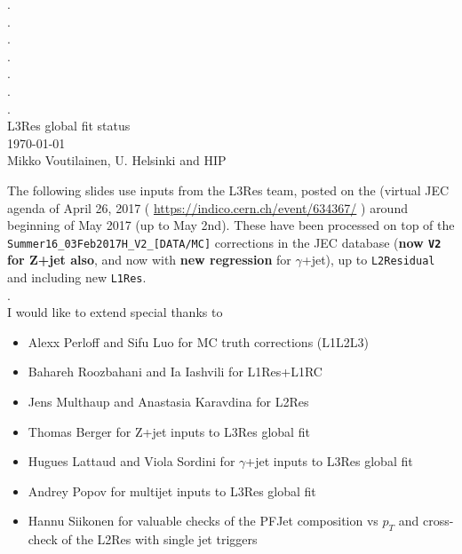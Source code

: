 \documentclass[landscape,10pt]{beamer} %
\begin{document}
\begin{centering}
{. }\\
{. }\\
{. }\\
{. }\\
{. }\\
{. }\\
{. }\\
L3Res global fit status\\
\today\\
Mikko Voutilainen, U. Helsinki and HIP\\
\end{centering}

\newpage

The following slides use inputs from the L3Res team, posted on the (virtual JEC agenda of April 26, 2017 ( \url{https://indico.cern.ch/event/634367/} ) around beginning of May 2017 (up to May 2nd).
These have been processed on top of the \verb|Summer16_03Feb2017H_V2_[DATA/MC]| corrections in the JEC database ({\bf now \verb|V2| for Z+jet also}, and now with {\bf new regression} for $\gamma$+jet), up to \verb|L2Residual| and including new \verb|L1Res|.\\
.\\
I would like to extend special thanks to
\begin{itemize}
\item Alexx Perloff and Sifu Luo for MC truth corrections (L1L2L3)
\item Bahareh Roozbahani and Ia Iashvili for L1Res+L1RC
\item Jens Multhaup and Anastasia Karavdina for L2Res
\item Thomas Berger for Z+jet inputs to L3Res global fit
\item Hugues Lattaud and Viola Sordini for $\gamma$+jet inputs to L3Res global fit
\item Andrey Popov for multijet inputs to L3Res global fit
\item Hannu Siikonen for valuable checks of the PFJet composition vs $p_T$ and cross-check of the L2Res with single jet triggers
\end{itemize}

\newpage
\end{document}
